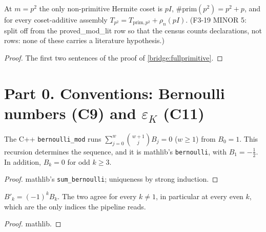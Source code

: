 \begin{lemma}\label{bridge:fullprimitive-aux}
  \leanok
  At $m=p^2$ the only non-primitive Hermite coset is $pI$, $\#\mathrm{prim}(p^2)=p^2+p$, and for every coset-additive assembly
  $T_{p^2}=T_{\mathrm{prim},p^2}+\rho_n(pI)$. (F3-19 MINOR 5: split off from the \textsf{proved\_mod\_lit} row so that the census counts declarations, not rows: none of these carries a literature hypothesis.)
\end{lemma}
\begin{proof}
  \leanok
  The first two sentences of the proof of \ref{bridge:fullprimitive}.
\end{proof}

\chapter{Part 0. Conventions: Bernoulli numbers (C9) and \texorpdfstring{$\varepsilon_K$}{epsilon\_K} (C11)}\label{ch:bernoulli}

\begin{definition}\label{conv:bernoulli}
  \leanok
  The C++ \texttt{bernoulli\_mod} runs $\sum_{j=0}^{w}\binom{w+1}{j}B_j=0$ ($w\ge1$) from $B_0=1$. This recursion
  determines the sequence, and it is mathlib's \texttt{bernoulli}, with $B_1=-\tfrac12$. In addition, $B_k=0$ for odd $k\ge3$.
\end{definition}
\begin{proof}
  \leanok
  mathlib's \texttt{sum\_bernoulli}; uniqueness by strong induction.
\end{proof}

\begin{theorem}\label{bridge:bernoulli}
  \leanok
  $B'_k=(-1)^kB_k$. The two agree for every $k\ne1$, in particular at every even $k$, which are the only indices the
  pipeline reads.
\end{theorem}
\begin{proof}
  \leanok
  mathlib.
\end{proof}

